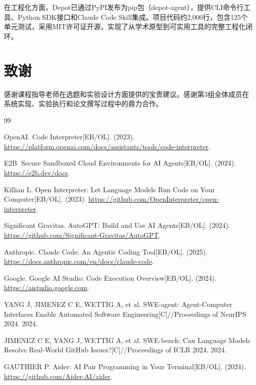 \documentclass[10pt]{ctexart}
\begin{document}
在工程化方面，Depot已通过PyPI发布为pip包（depot-agent），提供CLI命令行工具、Python SDK接口和Claude Code Skill集成。项目代码约2,000行，包含125个单元测试，采用MIT许可证开源，实现了从学术原型到可实用工具的完整工程化闭环。

\section*{致谢}
感谢课程指导老师在选题和实验设计方面提供的宝贵建议。感谢第3组全体成员在系统实现、实验执行和论文撰写过程中的鼎力合作。

\begin{thebibliography}{99}

OpenAI.
 Code Interpreter[EB/OL]. (2023). \url{https://platform.openai.com/docs/assistants/tools/code-interpreter}.

E2B.
 Secure Sandboxed Cloud Environments for AI Agents[EB/OL]. (2024). \url{https://e2b.dev/docs}.

Killian L.
 Open Interpreter: Let Language Models Run Code on Your Computer[EB/OL]. (2023). \url{https://github.com/OpenInterpreter/open-interpreter}.

Significant Gravitas.
 AutoGPT: Build and Use AI Agents[EB/OL]. (2024). \url{https://github.com/Significant-Gravitas/AutoGPT}.

Anthropic.
 Claude Code: An Agentic Coding Tool[EB/OL]. (2025). \url{https://docs.anthropic.com/en/docs/claude-code}.

Google.
 Google AI Studio: Code Execution Overview[EB/OL]. (2024). \url{https://aistudio.google.com}.

YANG J, JIMENEZ C E, WETTIG A, et al.
 SWE-agent: Agent-Computer Interfaces Enable Automated Software Engineering[C]//Proceedings of NeurIPS 2024. 2024.

JIMENEZ C E, YANG J, WETTIG A, et al.
 SWE-bench: Can Language Models Resolve Real-World GitHub Issues?[C]//Proceedings of ICLR 2024. 2024.

GAUTHIER P.
 Aider: AI Pair Programming in Your Terminal[EB/OL]. (2024). \url{https://github.com/Aider-AI/aider}.


\end{thebibliography}
\end{document}
